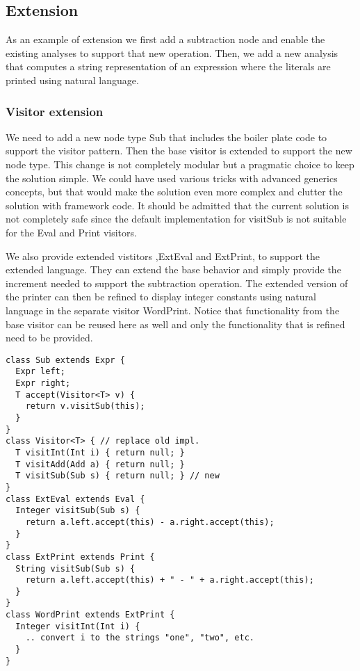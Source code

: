 \subsection{Extension}
As an example of extension we first add a subtraction node and enable the
existing analyses to support that new operation. Then, we add a new
analysis that computes a string representation of an expression where the
literals are printed using natural language.

\subsubsection{Visitor extension}
We need to add a new node type Sub that includes the boiler plate code to
support the visitor pattern. Then the base visitor is extended to support
the new node type. This change is not completely modular but a pragmatic
choice to keep the solution simple. We could have used various tricks with advanced
generics concepts, but that would make the solution even more complex and 
clutter the solution with framework code. It should be admitted that the 
current solution is not
completely safe since the default implementation for visitSub is not
suitable for the Eval and Print visitors. 

We also provide extended vistitors
,ExtEval and ExtPrint, to support the extended language.
They can extend the base behavior and simply provide the increment
needed to support the subtraction operation. The extended version of the
printer can then be refined to display integer constants using natural
language in the separate visitor WordPrint. Notice that functionality from
the base visitor can be reused here as well and only the functionality 
that is refined need to be provided.

\begin{lstlisting}[caption={Visitor Extension}]
class Sub extends Expr {
  Expr left;
  Expr right;
  T accept(Visitor<T> v) {
    return v.visitSub(this);
  }
}
class Visitor<T> { // replace old impl.
  T visitInt(Int i) { return null; }
  T visitAdd(Add a) { return null; }
  T visitSub(Sub s) { return null; } // new
}
class ExtEval extends Eval {
  Integer visitSub(Sub s) {
    return a.left.accept(this) - a.right.accept(this);
  }
}
class ExtPrint extends Print {
  String visitSub(Sub s) {
    return a.left.accept(this) + " - " + a.right.accept(this);
  }
}
class WordPrint extends ExtPrint {
  Integer visitInt(Int i) {
    .. convert i to the strings "one", "two", etc.
  }
}
\end{lstlisting}

